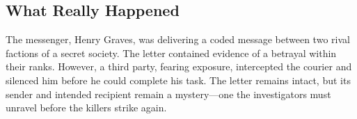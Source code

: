 \subsection{What Really Happened} 
The messenger, Henry Graves, was delivering a coded message between two rival factions of a secret society. The letter contained evidence of a betrayal within their ranks. However, a third party, fearing exposure, intercepted the courier and silenced him before he could complete his task. The letter remains intact, but its sender and intended recipient remain a mystery—one the investigators must unravel before the killers strike again.


